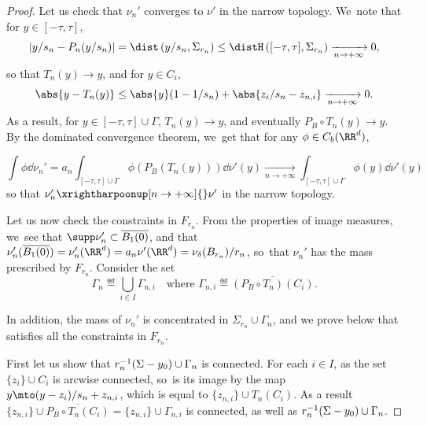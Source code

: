 \begin{proof}
Let us check that $\nu_n'$ converges to $\nu'$ in the narrow topology. We~note that for $y\in [-\tau,\tau]$,
\[
|y/s_{n} - P_n(y/s_{n})| = \dist\left(y/s_{n}, \Sigma_{r_n}\right) \le \distH\left([-\tau, \tau], \Sigma_{r_n}\right)\xrightarrow[n\to +\infty]{} 0,
\]
so that $T_{n}(y)\to y$, and for $y\in C_{i}$,
\[
\abs{y-T_{n}(y)}\le \abs{y}(1-1/s_{n}) + \abs{z_i/s_n-z_{n,i}}\xrightarrow[n\to +\infty]{} 0.
\]
As a result, for $y\in [-\tau,\tau]\cup \Gamma$, $T_n(y)\to y$, and eventually $P_B\circ T_n(y)\to y$.
By the dominated convergence theorem, we~get that for any $\phi\in C_b(\RR^d)$,

\[
\int\phi\dd \nu_n'
=
a_n\int_{[-\tau,\tau]\cup \Gamma}\phi\left(P_B(T_n(y))\right)\dd \nu'(y)
\xrightarrow[n\to +\infty]{}
\int_{[-\tau,\tau]\cup \Gamma}\phi\left(y\right)\dd \nu'(y)
\]
so that $\nu_n'\xrightharpoonup[n\to +\infty]{}\nu'$ in the narrow topology.

Let us now check the constraints in $F_{r_n}$. From the properties of image measures, we~see that $\supp \nu_n'\subset \overline{B_{1}(0)}$, and that $\nu_n'(\overline{B_{1}(0)})=\nu_n'(\RR^d)=a_n\nu'(\RR^{d})= \nu_{\delta}(B_{r_n})/r_n$, so~that $\nu_n'$ has the mass prescribed by $F_{r_n}$. Consider the set
\begin{equation}\label{eq.defgamman}
\Gamma_n\eqdef
\bigcup_{i\in I} \Gamma_{n,i}
\quad
\mbox{where }
\Gamma_{n,i}\eqdef \overline{(P_B\circ T_{n})(C_{i})}.
\end{equation}

In addition, the mass of $\nu_n'$ is concentrated in $\Sigma_{r_n}\cup \Gamma_n$, and we prove below that satisfies all the constraints in $F_{r_{n}}$.

First let us show that $r_n^{-1}(\Sigma -\nobreak y_0) \cup\nobreak \Gamma_n$ is connected. For each $i\in I$, as the set $\{z_{i}\}\cup C_{i}$ is arcwise connected, so~is its image by the map $y\mto (y-z_{i})/s_n+z_{n,i}$, which is equal to $\{z_{n,i}\}\cup T_n(C_i)$. As a result $\{z_{n,i}\}\cup \overline{P_B\circ T_n(C_i)} = \{z_{n,i}\}\cup \Gamma_{n,i}$ is connected, as well as $r_n^{-1}(\Sigma -\nobreak y_0) \cup\nobreak \Gamma_n$.


\end{proof}
